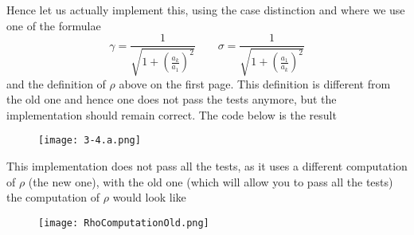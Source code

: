 \documentclass{article}
\begin{document}
Hence let us actually implement this, using the case distinction and where we use one of the formulae
\begin{equation*}
    \gamma =  \frac{1}{\sqrt{1 + \left(\frac{a_{k}}{a_{1}}\right)^{2}}} \qquad \sigma = \frac{1}{\sqrt{1 + \left(\frac{a_{1}}{a_{k}}\right)^{2}}}
\end{equation*}
and the definition of $\rho$ above on the first page. This definition is different from the old one and hence one does not pass the tests anymore, but the implementation should remain correct. The code below is the result
\begin{figure}[!hbt]
    \centering
\texttt{[image: 3-4.a.png]}
\end{figure}

\pagebreak

\noindent This implementation does not pass all the tests, as it uses a different computation of $\rho$ (the new one), with the old one (which will allow you to pass all the tests) the computation of $\rho$ would look like
\begin{figure}[!hbt]
    \centering
\texttt{[image: RhoComputationOld.png]}
\end{figure}
\end{document}
